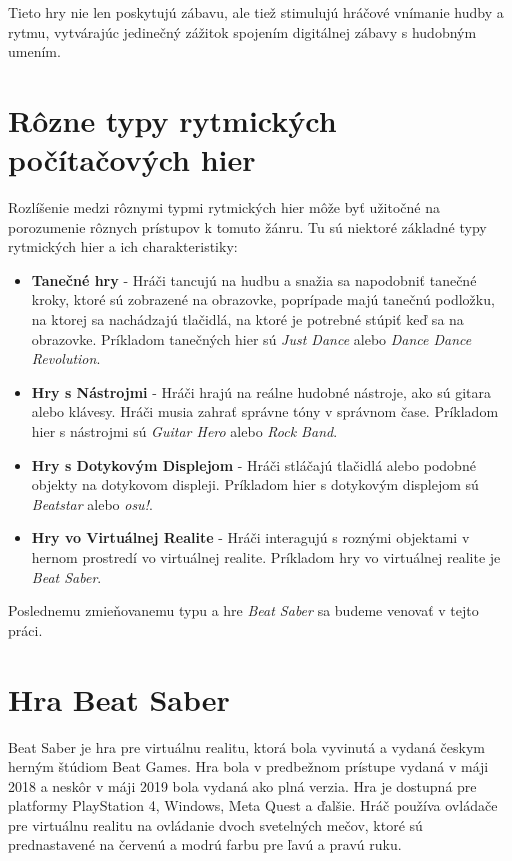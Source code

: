 Tieto hry nie len poskytujú zábavu, ale tiež stimulujú hráčové vnímanie hudby a rytmu, vytvárajúc jedinečný zážitok spojením digitálnej zábavy s hudobným umením.

\section{Rôzne typy rytmických počítačových hier}\label{sec:typy}


Rozlíšenie medzi rôznymi typmi rytmických hier môže byť užitočné na porozumenie rôznych prístupov k tomuto žánru. Tu sú niektoré základné typy rytmických hier a ich charakteristiky:

\begin{itemize}

\item \textbf{Tanečné hry} - Hráči tancujú na hudbu a snažia sa napodobniť tanečné kroky, ktoré sú zobrazené na obrazovke, poprípade majú tanečnú podložku, na ktorej sa nachádzajú tlačidlá, na ktoré je potrebné stúpiť keď sa na obrazovke. Príkladom tanečných hier sú \textit{Just Dance} alebo \textit{Dance Dance Revolution}.
\item \textbf{Hry s Nástrojmi} - Hráči hrajú na reálne hudobné nástroje, ako sú gitara alebo klávesy. Hráči musia zahrať správne tóny v správnom čase. Príkladom hier s nástrojmi sú \textit{Guitar Hero} alebo \textit{Rock Band}.
\item \textbf{Hry s Dotykovým Displejom} - Hráči stláčajú tlačidlá alebo podobné objekty na dotykovom displeji. Príkladom hier s dotykovým displejom sú \textit{Beatstar} alebo \textit{osu!}.
\item \textbf{Hry vo Virtuálnej Realite} - Hráči interagujú s roznými objektami v hernom prostredí vo virtuálnej realite. Príkladom hry vo virtuálnej realite je \textit{Beat Saber}.
\end{itemize}

Poslednemu zmieňovanemu typu a hre \textit{Beat Saber} sa budeme venovať v tejto práci. 

\section{Hra Beat Saber}\label{sec:beat_saber}

Beat Saber je hra pre virtuálnu realitu, ktorá bola vyvinutá a vydaná českym herným štúdiom Beat Games. Hra bola v predbežnom prístupe vydaná v máji 2018 a neskôr v máji 2019 bola vydaná ako plná verzia. Hra je dostupná pre platformy PlayStation 4, Windows, Meta Quest a ďalšie. Hráč používa ovládače pre virtuálnu realitu na ovládanie dvoch svetelných mečov, ktoré sú prednastavené na červenú a modrú farbu pre ľavú a pravú ruku. \cite{sutrich2020beatsaber}

